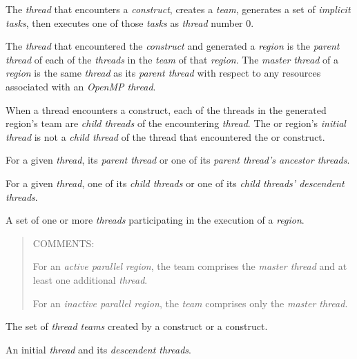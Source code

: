 \glossarydefstart
The \emph{thread} that encounters a  \emph{construct}, creates a \emph{team}, generates a set 
of \emph{implicit tasks}, then executes one of those \emph{tasks} as \emph{thread} number 0.
\glossarydefend

\glossarydefstart
The \emph{thread} that encountered the  \emph{construct} and generated a 
 \emph{region} is the \emph{parent thread} of each of the 
\emph{threads} in the \emph{team} of that 
 \emph{region}. The \emph{master thread} 
of a  \emph{region} is the same \emph{thread} 
as its \emph{parent thread} with respect to any resources associated with an \emph{OpenMP thread}.
\glossarydefend

\glossarydefstart
When a thread encounters a  construct, each of the threads in the 
generated  region's team are \emph{child threads} of the encountering \emph{thread}. 
The  or  region's \emph{initial thread} is not a \emph{child thread} of the thread 
that encountered the  or  construct. 
\glossarydefend

\glossarydefstart
For a given \emph{thread}, its \emph{parent thread} or one of its \emph{parent thread’s ancestor threads}.
\glossarydefend

\glossarydefstart
For a given \emph{thread}, one of its \emph{child threads} or one of 
its \emph{child threads’ descendent threads}.
\glossarydefend

\glossarydefstart
A set of one or more \emph{threads} participating in the execution of a 
\emph{region}.

\begin{quote}
COMMENTS:

For an \emph{active parallel region}, the team comprises the \emph{master thread} 
and at least one additional \emph{thread}.

For an \emph{inactive parallel region}, the \emph{team} comprises only the \emph{master thread}.
\end{quote}
\glossarydefend

\glossarydefstart
The set of \emph{thread teams} created by a  construct or a  construct.
\glossarydefend

\glossarydefstart
An initial \emph{thread} and its \emph{descendent threads}.
\glossarydefend

